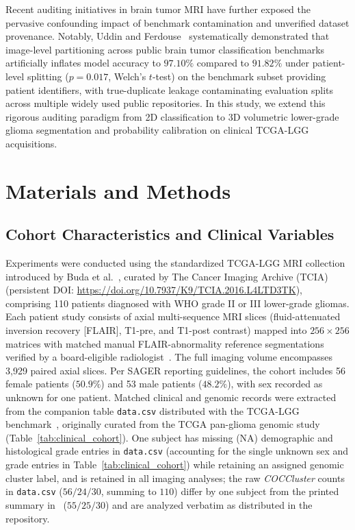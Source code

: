 \documentclass[11pt,a4paper]{article}
\begin{document}
Recent auditing initiatives in brain tumor MRI have further exposed the pervasive confounding impact of benchmark contamination and unverified dataset provenance. Notably, Uddin and Ferdouse~\cite{uddin2026data} systematically demonstrated that image-level partitioning across public brain tumor classification benchmarks artificially inflates model accuracy to $97.10\%$ compared to $91.82\%$ under patient-level splitting ($p=0.017$, Welch's $t$-test) on the benchmark subset providing patient identifiers, with true-duplicate leakage contaminating evaluation splits across multiple widely used public repositories. In this study, we extend this rigorous auditing paradigm from 2D classification to 3D volumetric lower-grade glioma segmentation and probability calibration on clinical TCGA-LGG acquisitions.

\section{Materials and Methods}
\subsection{Cohort Characteristics and Clinical Variables}
Experiments were conducted using the standardized TCGA-LGG MRI collection introduced by Buda et al.~\cite{buda2019association}, curated by The Cancer Imaging Archive (TCIA)~\cite{clark2013cancer,pedano2016cancer} (persistent DOI: \url{https://doi.org/10.7937/K9/TCIA.2016.L4LTD3TK}), comprising 110 patients diagnosed with WHO grade II or III lower-grade gliomas. Each patient study consists of axial multi-sequence MRI slices (fluid-attenuated inversion recovery [FLAIR], T1-pre, and T1-post contrast) mapped into $256 \times 256$ matrices with matched manual FLAIR-abnormality reference segmentations verified by a board-eligible radiologist~\cite{buda2019association}. The full imaging volume encompasses 3,929 paired axial slices. Per SAGER reporting guidelines, the cohort includes 56 female patients ($50.9\%$) and 53 male patients ($48.2\%$), with sex recorded as unknown for one patient. Matched clinical and genomic records were extracted from the companion table \texttt{data.csv} distributed with the TCGA-LGG benchmark~\cite{buda2019association,pedano2016cancer}, originally curated from the TCGA pan-glioma genomic study~\cite{ceccarelli2016molecular} (Table~\ref{tab:clinical_cohort}). One subject has missing (NA) demographic and histological grade entries in \texttt{data.csv} (accounting for the single unknown sex and grade entries in Table~\ref{tab:clinical_cohort}) while retaining an assigned genomic cluster label, and is retained in all imaging analyses; the raw \textit{COCCluster} counts in \texttt{data.csv} ($56/24/30$, summing to $110$) differ by one subject from the printed summary in~\cite{buda2019association} ($55/25/30$) and are analyzed verbatim as distributed in the repository.
\end{document}
